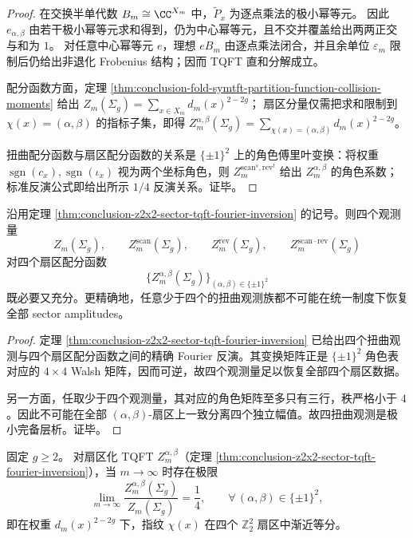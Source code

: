 \begin{proof}
在交换半单代数 \(B_m\cong \CC^{X_m}\) 中，\(\widetilde P_x\) 为逐点乘法的极小幂等元。
因此 \(e_{\alpha,\beta}\) 由若干极小幂等元求和得到，仍为中心幂等元，且不交并覆盖给出两两正交与和为 \(1\)。
对任意中心幂等元 \(e\)，理想 \(eB_m\) 由逐点乘法闭合，并且余单位 \(\varepsilon_m\) 限制后仍给出非退化 Frobenius 结构；因而 TQFT 直和分解成立。
\par
配分函数方面，定理 \ref{thm:conclusion-fold-symtft-partition-function-collision-moments} 给出
\(
Z_m(\Sigma_g)=\sum_{x\in X_m}d_m(x)^{2-2g}
\)；
扇区分量仅需把求和限制到 \(\chi(x)=(\alpha,\beta)\) 的指标子集，即得
\(
Z_m^{\alpha,\beta}(\Sigma_g)=\sum_{\chi(x)=(\alpha,\beta)}d_m(x)^{2-2g}
\)。
\par
扭曲配分函数与扇区配分函数的关系是 \(\{\pm1\}^2\) 上的角色傅里叶变换：将权重 \(\operatorname{sgn}(c_x),\operatorname{sgn}(\iota_x)\) 视为两个坐标角色，则 \(Z_m^{\mathrm{scan}^s,\mathrm{rev}^t}\) 给出 \(Z_m^{\alpha,\beta}\) 的角色系数；标准反演公式即给出所示 \(1/4\) 反演关系。证毕。
\end{proof}

\begin{theorem}[四扭曲观测的极小完备层析]\label{thm:conclusion-z2x2-twisted-observables-minimal-complete}
沿用定理 \ref{thm:conclusion-z2x2-sector-tqft-fourier-inversion} 的记号。则四个观测量
\[
Z_m(\Sigma_g),\qquad
Z_m^{\mathrm{scan}}(\Sigma_g),\qquad
Z_m^{\mathrm{rev}}(\Sigma_g),\qquad
Z_m^{\mathrm{scan\cdot rev}}(\Sigma_g)
\]
对四个扇区配分函数
\[
\bigl\{Z_m^{\alpha,\beta}(\Sigma_g)\bigr\}_{(\alpha,\beta)\in\{\pm1\}^2}
\]
既必要又充分。更精确地，任意少于四个的扭曲观测族都不可能在统一制度下恢复全部 sector amplitudes。
\end{theorem}

\begin{proof}
定理 \ref{thm:conclusion-z2x2-sector-tqft-fourier-inversion} 已给出四个扭曲观测与四个扇区配分函数之间的精确 Fourier 反演。其变换矩阵正是 \(\{\pm1\}^2\) 角色表对应的 \(4\times 4\) Walsh 矩阵，因而可逆，故四个观测量足以恢复全部四个扇区数据。

另一方面，任取少于四个观测量，其对应的角色矩阵至多只有三行，秩严格小于 \(4\)。因此不可能在全部 \((\alpha,\beta)\)-扇区上一致分离四个独立幅值。故四扭曲观测是极小完备层析。证毕。
\end{proof}

\begin{conjecture}[扇区化配分函数的加权等分律]\label{conj:conclusion-z2x2-sector-tqft-weighted-equidistribution}
固定 \(g\ge 2\)。
对扇区化 TQFT \(Z_m^{\alpha,\beta}\)（定理 \ref{thm:conclusion-z2x2-sector-tqft-fourier-inversion}），当 \(m\to\infty\) 时存在极限
\[
\lim_{m\to\infty}\frac{Z_m^{\alpha,\beta}(\Sigma_g)}{Z_m(\Sigma_g)}=\frac14,
\qquad
\forall\,(\alpha,\beta)\in\{\pm1\}^2,
\]
即在权重 \(d_m(x)^{2-2g}\) 下，指纹 \(\chi(x)\) 在四个 \(\mathbb Z_2^2\) 扇区中渐近等分。
\end{conjecture}
